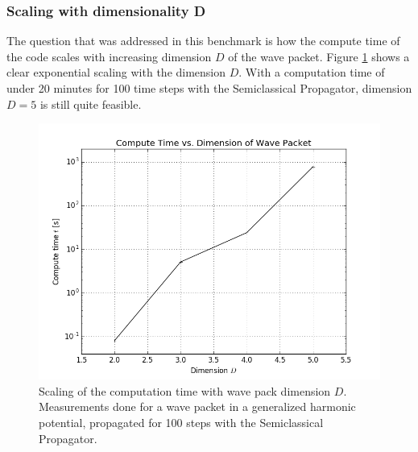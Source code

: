 \subsubsection{Scaling with dimensionality D}
%
The question that was addressed in this benchmark is how the compute time of the code scales with increasing dimension $D$ of the wave packet.
Figure \ref{fig:dimension_analysis} shows a clear exponential scaling with the dimension $D$.
With a computation time of under 20 minutes for 100 time steps with the Semiclassical Propagator, dimension $D=5$ is still quite feasible.
%
\begin{figure}[ht]
	\centering
	\includegraphics[width=.8\textwidth]{figures/dimension_analysis.png}
	\caption{Scaling of the computation time with wave pack dimension $D$. Measurements done for a wave packet in a generalized harmonic potential, propagated for 100 steps with the Semiclassical Propagator.}
	\label{fig:dimension_analysis}
\end{figure}
